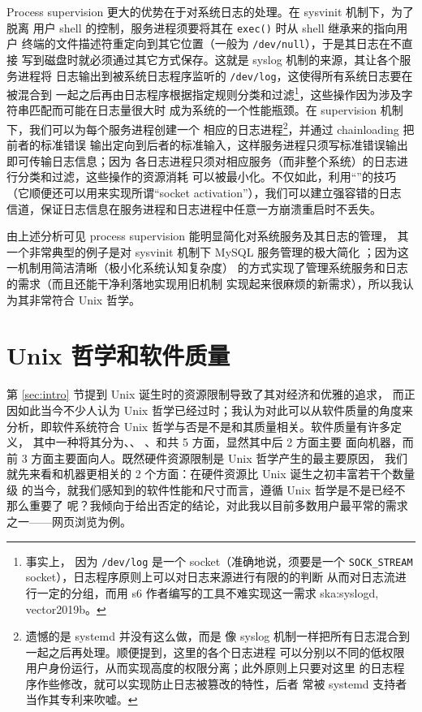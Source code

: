 Process supervision 更大的优势在于对系统日志的处理。在 sysvinit 机制下，为了脱离
用户 shell 的控制，服务进程须要将其在 \verb|exec()| 时从 shell 继承来的指向用户
终端的文件描述符重定向到其它位置（一般为 \verb|/dev/null|），于是其日志在不直接
写到磁盘时就必须通过其它方式保存。这就是 syslog 机制的来源，其让各个服务进程将
日志输出到被系统日志程序监听的 \verb|/dev/log|，这使得所有系统日志要在被混合到
一起之后再由日志程序根据指定规则分类和过滤\footnote{\label{fn:logtype}事实上，
因为 \texttt{/dev/log} 是一个 socket（准确地说，须要是一个 \texttt{SOCK\_STREAM}
socket），日志程序原则上可以对日志来源进行有限的的判断
从而对日志流进行一定的分组，而用 s6 作者编写的工具不难实现这一需求\cupercite%
{ska:syslogd, vector2019b}。}，这些操作因为涉及字符串匹配而可能在日志量很大时
成为系统的一个性能瓶颈。在 supervision 机制下，我们可以为每个服务进程创建一个
相应的日志进程\footnote{遗憾的是 systemd 并没有这么做，而是
像 syslog 机制一样把所有日志混合到一起之后再处理。顺便提到，这里的各个日志进程
可以分别以不同的低权限用户身份运行，从而实现高度的权限分离；此外原则上只要对这里
的日志程序作些修改，就可以实现防止日志被篡改的特性，后者
常被 systemd 支持者当作其专利来吹嘘。}，并通过 chainloading 把前者的标准错误
输出定向到后者的标准输入，这样服务进程只须写标准错误输出即可传输日志信息；因为
各日志进程只须对相应服务（而非整个系统）的日志进行分类和过滤，这些操作的资源消耗
可以被最小化。不仅如此，利用“”的技巧%
（它顺便还可以用来实现所谓“socket activation”），我们可以建立强容错的日志
信道，保证日志信息在服务进程和日志进程中任意一方崩溃重启时不丢失。

由上述分析可见 process supervision 能明显简化对系统服务及其日志的管理，
其一个非常典型的例子是对 sysvinit 机制下 MySQL 服务管理的极大简化%
；因为这一机制用简洁清晰（极小化系统认知复杂度）
的方式实现了管理系统服务和日志的需求（而且还能干净利落地实现用旧机制
实现起来很麻烦的新需求），所以我认为其非常符合 Unix 哲学。

\section{Unix 哲学和软件质量}\label{sec:quality}

第 \ref{sec:intro} 节提到 Unix 诞生时的资源限制导致了其对经济和优雅的追求，
而正因如此当今不少人认为 Unix 哲学已经过时；我认为对此可以从软件质量的角度来
分析，即软件系统符合 Unix 哲学与否是不是和其质量相关。软件质量有许多定义，
其中一种将其分为、、%
、和共 5 方面，显然其中后 2 方面主要
面向机器，而前 3 方面主要面向人。既然硬件资源限制是 Unix 哲学产生的最主要原因，
我们就先来看和机器更相关的 2 个方面：在硬件资源比 Unix 诞生之初丰富若干个数量级
的当今，就我们感知到的软件性能和尺寸而言，遵循 Unix 哲学是不是已经不那么重要了
呢？我倾向于给出否定的结论，对此我以目前多数用户最平常的需求之一——网页浏览为例。

